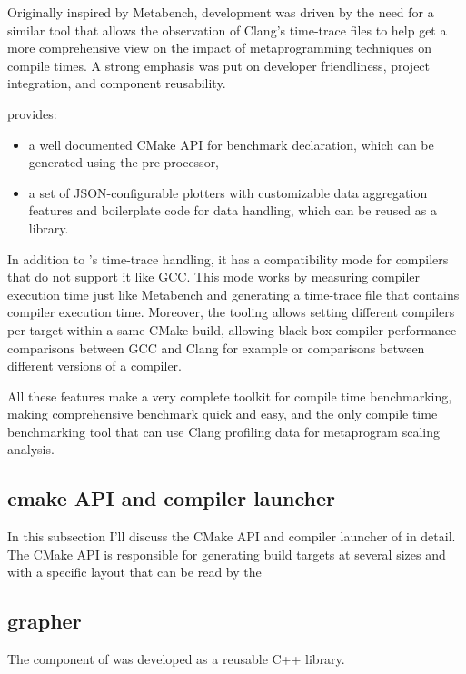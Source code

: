 \documentclass[../../main.tex]{subfiles}
\begin{document}
Originally inspired by Metabench\cite{metabench}, \ctbench development was
driven by the need for a similar tool that allows the observation of Clang's
time-trace files to help get a more comprehensive view on the impact of
metaprogramming techniques on compile times. A strong emphasis was put on
developer friendliness, project integration, and component reusability.

\ctbench provides:

\begin{itemize}
\item a well documented CMake API for benchmark declaration, which can be
      generated using the \cpp pre-processor,
\item a set of JSON-configurable plotters with customizable data aggregation
      features and boilerplate code for data handling, which can be reused as a
      \cpp library.
\end{itemize}

In addition to \ctbench's time-trace handling, it has a compatibility mode
for compilers that do not support it like GCC. This mode works by measuring
compiler execution time just like Metabench\cite{metabench} and generating a
time-trace file that contains compiler execution time. Moreover, the tooling
allows setting different compilers per target within a same CMake build,
allowing black-box compiler performance comparisons between GCC and Clang for
example or comparisons between different versions of a compiler.

All these features make \ctbench a very complete toolkit for compile time
benchmarking, making comprehensive benchmark quick and easy, and the only
compile time benchmarking tool that can use Clang profiling data for metaprogram
scaling analysis.

\subsection{cmake API and compiler launcher}

In this subsection I'll discuss the CMake API and compiler launcher of \ctbench
in detail. The CMake API is responsible for generating build targets at several
sizes and with a specific layout that can be read by the

\subsection{grapher}

The \grapher component of \ctbench was developed as a reusable C++ library.
\end{document}
